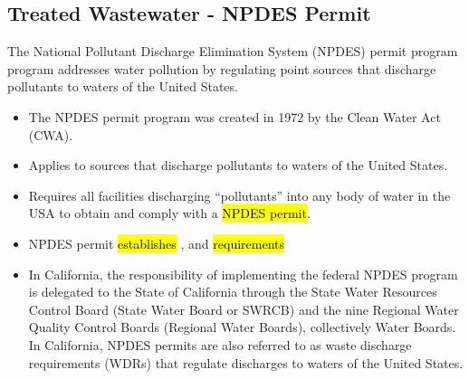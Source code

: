   
\subsection{Treated Wastewater - NPDES Permit}
The National Pollutant Discharge Elimination System (NPDES) permit program program addresses water pollution by regulating point sources that discharge pollutants to waters of the United States.

\begin{itemize}
\item The NPDES permit program was created in 1972 by the Clean Water Act (CWA).
\item Applies to sources that discharge pollutants to waters of the United States.
\item Requires all facilities discharging “pollutants” into any body of water in the USA to obtain and comply with a \hl{NPDES permit}.
\item NPDES permit \hl{establishes} ,  and  \hl{requirements}\\
\item In California, the responsibility of implementing the federal NPDES program is delegated to the State of California through the State Water Resources Control Board (State Water Board or SWRCB) and the nine Regional Water Quality Control Boards (Regional Water Boards), collectively Water Boards. In California, NPDES permits are also referred to as waste discharge requirements (WDRs) that regulate discharges to waters of the United States.
\end{itemize}

